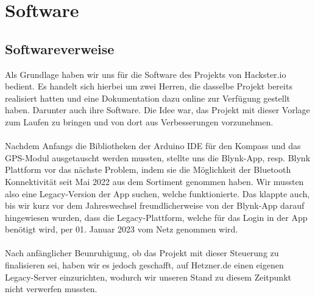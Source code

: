 \section{Software}

\subsection{Softwareverweise}
Als Grundlage haben wir uns für die Software des Projekts von Hackster.io bedient. Es handelt sich hierbei um zwei Herren, die dasselbe Projekt bereits realisiert hatten und eine Dokumentation dazu online zur Verfügung gestellt haben. Darunter auch ihre Software. Die Idee war, das Projekt mit dieser Vorlage zum Laufen zu bringen und von dort aus Verbesserungen vorzunehmen. \\
\\
Nachdem Anfangs die Bibliotheken der Arduino IDE für den Kompass und das GPS-Modul ausgetauscht werden mussten, stellte uns die Blynk-App, resp. Blynk Plattform vor das nächste Problem, indem sie die Möglichkeit der Bluetooth Konnektivität seit Mai 2022 aus dem Sortiment genommen haben. Wir mussten also eine Legacy-Version der App suchen, welche funktionierte. Das klappte auch, bis wir kurz vor dem Jahreswechsel freundlicherweise von der Blynk-App darauf hingewiesen wurden, dass die Legacy-Plattform, welche für das Login in der App benötigt wird, per 01. Januar 2023 vom Netz genommen wird.\\
\\
Nach anfänglicher Beunruhigung, ob das Projekt mit dieser Steuerung zu finalisieren sei,  haben wir es jedoch geschafft, auf Hetzner.de einen eigenen Legacy-Server einzurichten, wodurch wir unseren Stand zu diesem Zeitpunkt nicht verwerfen mussten. 